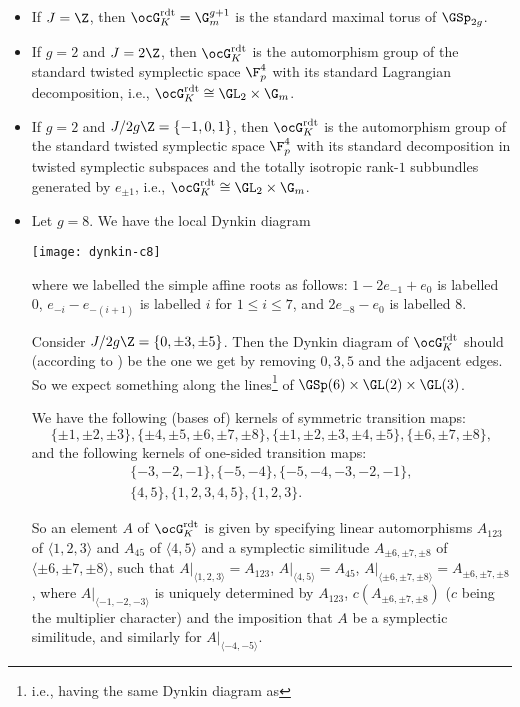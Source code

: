 \documentclass[a4paper]{scrartcl} %
\numberwithin{equation}{section}
\begin{document}
\begin{Example}\label{GKrdt-ex}
  \begin{itemize}
  \item If $J=\Z$, then $\ocG_K^\mathrm{rdt}=\G_m^{g+1}$ is the standard maximal torus of $\GSp_{2g}$.
  \item If $g=2$ and $J=2\Z$, then $\ocG_K^\mathrm{rdt}$ is the automorphism group of the standard twisted symplectic space $\F_p^4$ with its standard Lagrangian decomposition, i.e., $\ocG_K^\mathrm{rdt}\cong\GL_2\times \G_m$.
  \item If $g=2$ and $J/2g\Z=\{-1,0,1\}$, then $\ocG_K^\mathrm{rdt}$ is the automorphism group of the standard twisted symplectic space $\F_p^4$ with its standard decomposition in twisted symplectic subspaces and the totally isotropic  rank-$1$ subbundles generated by $e_{\pm 1}$, i.e., $\ocG_K^\mathrm{rdt}\cong\GL_2\times\G_m$.
  \item Let $g=8$. We have the local Dynkin diagram
    \begin{center}
      \texttt{[image: dynkin-c8]}
    \end{center}
    where we labelled the simple affine roots as follows: $1-2e_{-1}+e_0$ is labelled 0, $e_{-i}-e_{-(i+1)}$ is labelled $i$ for $1\leq i\leq 7$, and $2e_{-8}-e_0$ is labelled 8.

    Consider $J/2g\Z=\{0,\pm 3,\pm 5\}$. Then the Dynkin diagram of $\ocG_K^\mathrm{rdt}$ should (according to \cite[.1]{tits}) be the one we get by removing $0,3,5$ and the adjacent edges. So we expect something along the lines\footnote{i.e., having the same Dynkin diagram as} of $\GSp(6)\times\GL(2)\times\GL(3)$.

    We have the following (bases of) kernels of symmetric transition maps:
    \begin{equation*}
      \{\pm 1, \pm 2, \pm 3\},\{\pm 4, \pm 5, \pm 6, \pm 7, \pm 8\},\{\pm 1, \pm 2, \pm 3, \pm 4, \pm 5\},\{\pm 6, \pm 7, \pm 8\},
    \end{equation*}
    and the following kernels of one-sided transition maps:
    \begin{align*}
      \{-3, -2, -1\},
      \{-5, -4\},
      \{-5, -4, -3, -2, -1\}, \\
      \{4, 5\},
      \{1, 2, 3, 4, 5\},
      \{1, 2, 3\}.
    \end{align*}

    So an element $A$ of $\ocG_K^\mathrm{rdt}$ is given by specifying linear automorphisms $A_{123}$ of  $\langle 1,2,3\rangle$ and $A_{45}$ of $\langle 4,5\rangle$ and a symplectic similitude $A_{\pm6,\pm7,\pm 8}$ of $\langle\pm 6,\pm 7,\pm 8\rangle$, such that $\left.A\right|_{\langle 1,2,3\rangle}=A_{123}$, $\left.A\right|_{\langle 4,5\rangle}=A_{45}$, $\left.A\right|_{\langle \pm 6,\pm 7,\pm8\rangle}=A_{\pm 6,\pm 7,\pm 8}$, where $\left.A\right|_{\langle -1,-2,-3\rangle}$ is uniquely determined by $A_{123}$, $c(A_{\pm 6,\pm 7,\pm 8})$ ($c$ being the multiplier character) and the imposition that $A$ be a symplectic similitude, and similarly for $\left.A\right|_{\langle -4,-5\rangle}$.


\end{itemize}
\end{Example}
\end{document}
